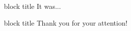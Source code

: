 \begin{frame}
\onslide<+->
\begin{beamercolorbox}[wd=.22\paperwidth,left,rounded=true,shadow=true]{block title}
   \Huge{It was...}
\end{beamercolorbox}
\onslide<+->
\titlepage
\onslide<+->
\hfill \begin{beamercolorbox}[wd=.79\paperwidth,left,rounded=true,shadow=true]{block title}
   \Huge{Thank you for your attention!}
\end{beamercolorbox}
\end{frame}